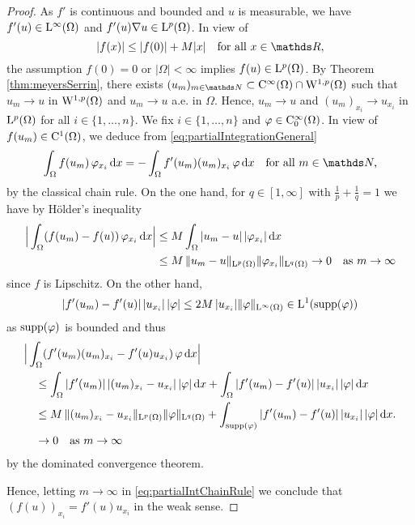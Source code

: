 \begin{proof}
  As $f'$ is continuous and bounded and $u$ is measurable, we have $f'(u)\in \mathrm{L}^\infty(\Omega)$ and $f'(u) \nabla u \in \mathrm{L}^p(\Omega)$.
  In view of 
  $$
  |f(x)| \leq |f(0)| + M|x| \quad\text{for all } x \in \R,
  $$
  the assumption $f(0)= 0$ or $|\Omega| < \infty$ implies $f(u) \in \mathrm{L}^p(\Omega)$.
  By Theorem \ref{thm:meyersSerrin}, there exists $(u_m)_{m \in \N} \subset \CC^\infty(\Omega) \cap \WW^{1,p}(\Omega)$ such that $u_m \to u$ in $\mathrm{W}^{1,p}(\Omega)$ and $u_m \to u$ a.e. in $\Omega$. 
  Hence, $u_m \to u$ and $(u_m)_{x_i} \to u_{x_i}$ in $\mathrm{L}^p(\Omega)$ for all $i \in \{1,\dots,n\}$.
  We fix $i \in \{ 1, \dots, n\}$ and $\varphi \in \mathrm{C}_0^\infty(\Omega)$.
  In view of $f(u_m) \in \mathrm{C}^1(\Omega)$, we deduce from \eqref{eq:partialIntegrationGeneral}
  \begin{equation}
    \label{eq:partialIntChainRule}
    \int_\Omega f(u_m) \, \varphi_{x_i} \d x = -\int_\Omega f'(u_m) (u_m)_{x_i} \,  \varphi \d x \quad\text{for all } m \in \N,
  \end{equation}
  by the classical chain rule.
  On the one hand, for $q \in [1,\infty]$ with $\frac{1}{p} + \frac{1}{q} = 1$  we have by Hölder's inequality
  \begin{align*}
    \Big| \int_\Omega (f(u_m) - f(u))\, \varphi_{x_i} \, {\operatorname{d}\!{x}} \Big|
    &\leq M \int_{\Omega} |u_m - u|\, |\varphi_{x_i}| \, {\operatorname{d}\!{x}} \\
    &\leq M\, \|u_m - u\|_{\mathrm{L}^p(\Omega)} \|\varphi_{x_i}\|_{\mathrm{L}^q(\Omega)} 
    \to 0 \quad\text{as } m \to \infty
  \end{align*}
  since $f$ is Lipschitz.
  On the other hand, 
  $$
  |f'(u_m) - f'(u)|\, |u_{x_i}|\, |\varphi| \leq 2M\, |u_{x_i}| \|\varphi\|_{\mathrm{L}^\infty(\Omega)} \in \mathrm{L}^1(\operatorname{supp}(\varphi))
  $$
  as $\operatorname{supp}(\varphi)$ is bounded and thus
  \begin{align*}
    &\Big |\int_\Omega (f'(u_m) (u_m)_{x_i} - f'(u)u_{x_i})\, \varphi \, {\operatorname{d}\!{x}} \Big| \\
    &\quad\leq \int_\Omega |f'(u_m)|\, |(u_m)_{x_i} - u_{x_i}|\,| \varphi | \, {\operatorname{d}\!{x}} 
    + \int_\Omega |f'(u_m) - f'(u)|\, |u_{x_i}|\, |\varphi| \, {\operatorname{d}\!{x}} \\
    &\quad\leq M\, \|(u_m)_{x_i} - u_{x_i}\|_{\mathrm{L}^p(\Omega)} \|\varphi\|_{\mathrm{L}^q(\Omega)}
    + \int_{\operatorname{supp}(\varphi)} |f'(u_m) - f'(u)|\, |u_{x_i}|\, |\varphi| \, {\operatorname{d}\!{x}} .
    \\&\quad \to 0 \quad\text{as } m \to \infty
  \end{align*}
   by the dominated convergence theorem.

   Hence, letting $m \to \infty$ in \eqref{eq:partialIntChainRule}  we conclude that $(f(u))_{x_i} = f'(u)u_{x_i}$ in the weak sense.
\end{proof}

